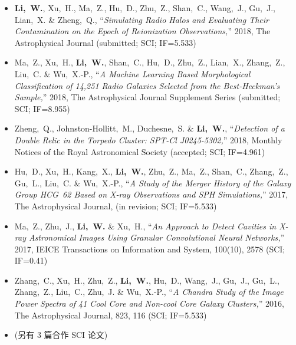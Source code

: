 \documentclass[zh]{resume}
\begin{document}
\begin{itemize}
  \small
  \item \textbf{Li,~W.}, Xu,~H., Ma,~Z., Hu,~D., Zhu,~Z., Shan,~C.,
    Wang,~J., Gu,~J., Lian,~X. \& Zheng,~Q.,
    \enquote{\it Simulating Radio Halos and Evaluating Their
      Contamination on the Epoch of Reionization Observations,}
    2018, The Astrophysical Journal (submitted; SCI; IF=5.533)
  \item Ma,~Z., Xu,~H., \textbf{Li,~W.}, Shan,~C., Hu,~D., Zhu,~Z.,
    Lian,~X., Zhang,~Z., Liu,~C. \& Wu,~X.-P.,
    \enquote{\it A Machine Learning Based Morphological Classification
      of 14,251 Radio Galaxies Selected from the Best-Heckman's Sample,}
    2018, The Astrophysical Journal Supplement Series
    (submitted; SCI; IF=8.955)
  \item Zheng,~Q., Johnston-Hollitt,~M., Duchesne,~S. \& \textbf{Li,~W.},
    \enquote{\it Detection of a Double Relic in the Torpedo Cluster:
      SPT-Cl J0245-5302,}
    2018, Monthly Notices of the Royal Astronomical Society
    (accepted; SCI; IF=4.961)
  \item Hu,~D., Xu,~H., Kang,~X., \textbf{Li,~W.}, Zhu,~Z., Ma,~Z.,
    Shan,~C., Zhang,~Z., Gu,~L., Liu,~C. \& Wu,~X.-P.,
    \enquote{\it A Study of the Merger History of the Galaxy Group
      HCG~62 Based on X-ray Observations and SPH Simulations,}
    2017, The Astrophysical Journal, (in revision; SCI; IF=5.533)
  \item Ma,~Z., Zhu,~J., \textbf{Li,~W.} \& Xu,~H.,
    \enquote{\it An Approach to Detect Cavities in X-ray Astronomical
      Images Using Granular Convolutional Neural Networks,}
    2017, IEICE Transactions on Information and System, 100(10), 2578
    (SCI; IF=0.41)
  \item Zhang,~C., Xu,~H., Zhu,~Z., \textbf{Li,~W.}, Hu,~D., Wang,~J.,
    Gu,~J., Gu,~L., Zhang,~Z., Liu,~C., Zhu,~J. \& Wu,~X.-P.,
    \enquote{\it A Chandra Study of the Image Power Spectra of 41
      Cool Core and Non-cool Core Galaxy Clusters,}
    2016, The Astrophysical Journal, 823, 116 (SCI; IF=5.533)
  \item (另有 3 篇合作 SCI 论文)
\end{itemize}
\end{document}
